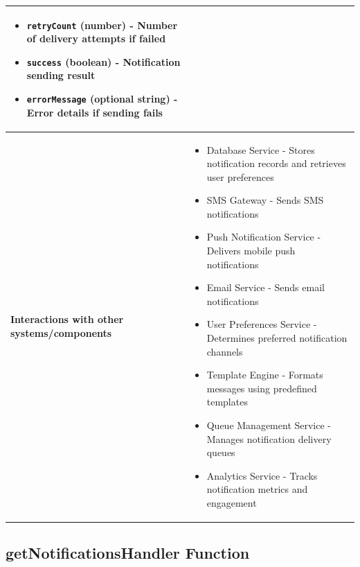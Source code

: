 \documentclass[11pt,a4paper]{article}
\begin{document}
\begin{longtable}{|p{3cm}|p{12cm}|}
\begin{itemize}[nosep]
\item \texttt{retryCount} (number) - Number of delivery attempts if failed
\item \texttt{success} (boolean) - Notification sending result
\item \texttt{errorMessage} (optional string) - Error details if sending fails
\end{itemize} \\
\hline
\textbf{Interactions with other systems/components} & 
\begin{itemize}[nosep]
\item Database Service - Stores notification records and retrieves user preferences
\item SMS Gateway - Sends SMS notifications
\item Push Notification Service - Delivers mobile push notifications
\item Email Service - Sends email notifications
\item User Preferences Service - Determines preferred notification channels
\item Template Engine - Formats messages using predefined templates
\item Queue Management Service - Manages notification delivery queues
\item Analytics Service - Tracks notification metrics and engagement
\end{itemize} \\
\hline
\end{longtable}

\subsection{getNotificationsHandler Function}
\end{document}
